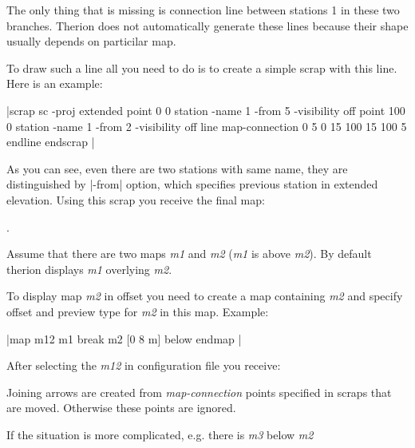 


 The only thing that is missing is connection line between stations 1
 in these two branches.
 Therion does not automatically generate these lines because their
 shape usually depends on particilar map. 




 To draw such a line all you need to do is to create a simple scrap 
 with this line. Here is an example:


|scrap sc -proj extended
  point 0 0 station -name 1 -from 5 -visibility off
  point 100 0 station -name 1 -from 2 -visibility off
  line map-connection
      0   5
      0  15
    100  15
    100   5
  endline
endscrap
|


 As you can see, even there are two stations with same name, they
 are distinguished by |-from| option, which specifies
 previous station in extended elevation. Using this scrap you receive the
 final map:






.


 Assume that there are two maps {\it m1} and {\it m2} 
 ({\it m1} is above {\it m2}). By default therion displays 
 {\it m1} overlying {\it m2}.







 To display map {\it m2} in offset you need to create a map
 containing {\it m2} and specify offset and preview type
 for {\it m2} in this map. Example:


|map m12
  m1
  break
  m2 [0 8 m] below
endmap
|


 After selecting the {\it m12} in configuration file you
 receive:







 Joining arrows are created from {\it map-connection} points
 specified in scraps that are moved. Otherwise these points are
 ignored.




 If the situation is more complicated, e.g. there is {\it m3}
 below {\it m2}







